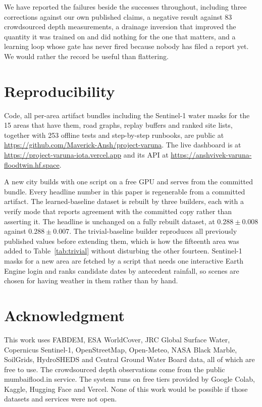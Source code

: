 We have reported the failures beside the successes throughout, including three corrections against
our own published claims, a negative result against 83 crowdsourced depth measurements, a drainage
inversion that improved the quantity it was trained on and did nothing for the one that matters,
and a learning loop whose gate has never fired because nobody has filed a report yet. We would
rather the record be useful than flattering.

\section*{Reproducibility}
Code, all per-area artifact bundles including the Sentinel-1 water masks for the 15 areas that have
them, road graphs, replay buffers and ranked site lists, together with 253 offline tests and
step-by-step runbooks, are public at
\url{https://github.com/Maverick-Ansh/project-varuna}. The live dashboard is at
\url{https://project-varuna-iota.vercel.app} and its API at
\url{https://anshvivek-varuna-floodtwin.hf.space}.

A new city builds with one script on a free GPU and serves from the committed bundle. Every headline
number in this paper is regenerable from a committed artifact. The learned-baseline dataset is
rebuilt by three builders, each with a verify mode that reports agreement with the committed copy
rather than asserting it. The headline is unchanged on a fully rebuilt dataset, at
$0.288 \pm 0.008$ against $0.288 \pm 0.007$. The trivial-baseline builder reproduces all previously
published values before extending them, which is how the fifteenth area was added to
Table~\ref{tab:trivial} without disturbing the other fourteen. Sentinel-1 masks for a new area are
fetched by a script that needs one interactive Earth Engine login and ranks candidate dates by
antecedent rainfall, so scenes are chosen for having weather in them rather than by hand.

\section*{Acknowledgment}
This work uses FABDEM, ESA WorldCover, JRC Global Surface Water, Copernicus Sentinel-1,
OpenStreetMap, Open-Meteo, NASA Black Marble, SoilGrids, HydroSHEDS and Central Ground Water Board
data, all of which are free to use. The crowdsourced depth observations come from the public
mumbaiflood.in service. The system runs on free tiers provided by Google Colab, Kaggle, Hugging Face
and Vercel. None of this work would be possible if those datasets and services were not open.
